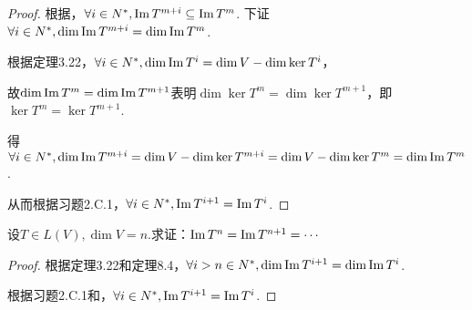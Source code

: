 \begin{proof}
    根据，\(\forall i \in N^*,\operatorname{Im} T^{m+i} \subseteq \operatorname{Im} T^m\).
    下证\(\forall i \in N^*,\dim \operatorname{Im} T^{m+i}=\dim \operatorname{Im} T^m\).
    
    根据定理3.22，\(\forall i \in N^*,\dim \operatorname{Im} T^i=\dim V-\dim \ker T^i\)，
    
    故\(\dim \operatorname{Im} T^m=\dim \operatorname{Im} T^{m+1}\)表明\(\dim \ker T^m=\dim \ker T^{m+1}\)，即\(\ker T^m =\ker T^{m+1}\).
    
    得\(\forall i \in N^*,\dim \operatorname{Im} T^{m+i}=\dim V-\dim \ker T^{m+i}=\dim V-\dim \ker T^m=\dim \operatorname{Im} T^m\).
    
    从而根据习题2.C.1，\(\forall i \in N^*,\operatorname{Im} T^{i+1}=\operatorname{Im} T^i\).
\end{proof}

\begin{problem}[18]\label{8.A.18}
    设\(T \in L(V),\dim V=n\).求证：\(\operatorname{Im} T^n=\operatorname{Im} T^{n+1}=\cdots\)
\end{problem}

\begin{proof}
    根据定理3.22和定理8.4，\(\forall i>n \in N^*,\dim \operatorname{Im} T^{i+1}=\dim \operatorname{Im} T^i\).

    根据习题2.C.1和，\(\forall i \in N^*,\operatorname{Im} T^{i+1}=\operatorname{Im} T^i\).
\end{proof}

